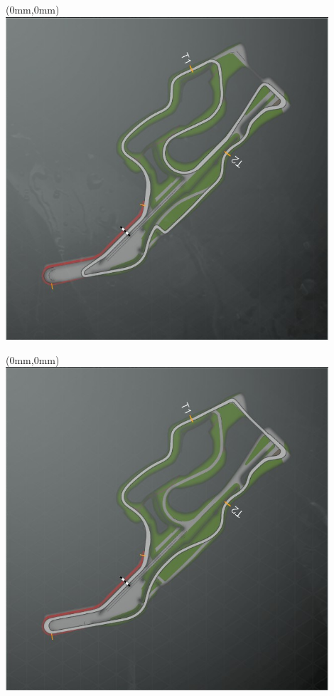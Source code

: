 \null\newpage
\begin{textblock*}{30mm}(0mm,0mm)%
\includegraphics[width=120mm]{TR/2015-05-20_00064.png}
\end{textblock*}
\null\newpage
\begin{textblock*}{30mm}(0mm,0mm)%
\includegraphics[width=120mm]{TR/2015-05-20_00063.png}
\end{textblock*}
